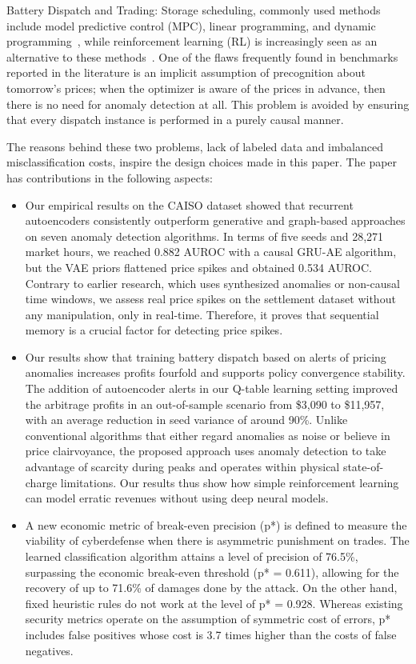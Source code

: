 \documentclass[journal]{IEEEtran}
\begin{document}
Battery Dispatch and Trading: Storage scheduling, commonly used methods include model predictive control (MPC), linear programming, and dynamic programming~\cite{Shi_BESS_Coopt}, while reinforcement learning (RL) is increasingly seen as an alternative to these methods~\cite{RL_Dispatch, Chen_DRL_BESS, Sutton_RL}. One of the flaws frequently found in benchmarks reported in the literature is an implicit assumption of precognition about tomorrow's prices; when the optimizer is aware of the prices in advance, then there is no need for anomaly detection at all. This problem is avoided by ensuring that every dispatch instance is performed in a purely causal manner.

The reasons behind these two problems, lack of labeled data and imbalanced misclassification costs, inspire the design choices made in this paper. The paper has contributions in the following aspects:
\begin{itemize}
\item Our empirical results on the CAISO dataset showed that recurrent autoencoders consistently outperform generative and graph-based approaches on seven anomaly detection algorithms. In terms of five seeds and 28,271 market hours, we reached 0.882 AUROC with a causal GRU-AE algorithm, but the VAE priors flattened price spikes and obtained 0.534 AUROC. Contrary to earlier research, which uses synthesized anomalies or non-causal time windows, we assess real price spikes on the settlement dataset without any manipulation, only in real-time. Therefore, it proves that sequential memory is a crucial factor for detecting price spikes.
\item Our results show that training battery dispatch based on alerts of pricing anomalies increases profits fourfold and supports policy convergence stability. The addition of autoencoder alerts in our Q-table learning setting improved the arbitrage profits in an out-of-sample scenario from \$3,090 to \$11,957, with an average reduction in seed variance of around 90\%. Unlike conventional algorithms that either regard anomalies as noise or believe in price clairvoyance, the proposed approach uses anomaly detection to take advantage of scarcity during peaks and operates within physical state-of-charge limitations. Our results thus show how simple reinforcement learning can model erratic revenues without using deep neural models.
\item A new economic metric of break-even precision (p*) is defined to measure the viability of cyberdefense when there is asymmetric punishment on trades. The learned classification algorithm attains a level of precision of 76.5\%, surpassing the economic break-even threshold (p* = 0.611), allowing for the recovery of up to 71.6\% of damages done by the attack. On the other hand, fixed heuristic rules do not work at the level of p* = 0.928. Whereas existing security metrics operate on the assumption of symmetric cost of errors, p* includes false positives whose cost is 3.7 times higher than the costs of false negatives.
\end{itemize}
\end{document}
